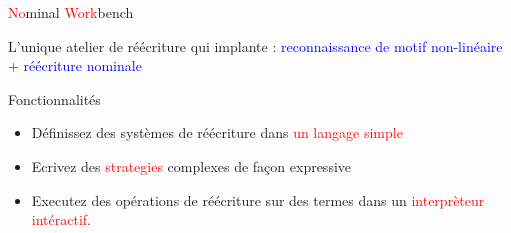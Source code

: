 \begin{frame}{\textcolor{red}{No}minal \textcolor{red}{Work}bench}

  L'unique atelier de réécriture qui implante :
  \textcolor{blue}{reconnaissance de motif non-linéaire} +
  \textcolor{blue}{réécriture nominale}

  \begin{block}{Fonctionnalités}
  \begin{itemize}
    \item Définissez des systèmes de réécriture dans \textcolor{red}{un langage simple}
    \item Ecrivez des \textcolor{red}{strategies}
      complexes de façon expressive
    \item Executez des opérations de réécriture sur des termes dans un
      \textcolor{red}{interprèteur intéractif}. 
  \end{itemize}
  \end{block}
  
\end{frame}




